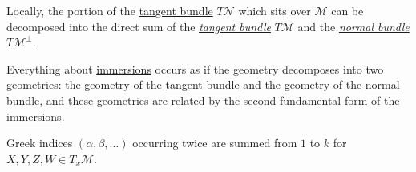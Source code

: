 \begin{intuition}
	Locally, the portion of the \hyperref[def:tangent-bundle]{tangent bundle} \(T \mathcal{N} \) which sits over \(\mathcal{M} \) can be decomposed into the direct sum of the \emph{\hyperref[def:tangent-bundle]{tangent bundle}} \(T \mathcal{M} \) and the \emph{\hyperref[not:normal-bundle]{normal bundle}} \(T \mathcal{M} ^{\perp} \).
\end{intuition}

Everything about \hyperref[def:immersion]{immersions} occurs as if the geometry decomposes into two geometries: the geometry of the \hyperref[def:tangent-bundle]{tangent bundle} and the geometry of the \hyperref[not:normal-bundle]{normal bundle}, and these geometries are related by the \hyperref[def:2nd-fundamental-form]{second fundamental form} of the \hyperref[def:immersion]{immersions}.

\begin{notation}
	Greek indices \((\alpha , \beta , \dots )\) occurring twice are summed from \(1\) to \(k\) for \(X, Y, Z, W \in T_x \mathcal{M} \).
\end{notation}

